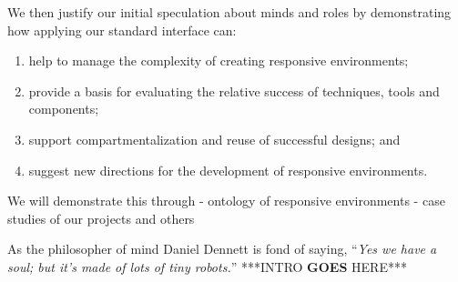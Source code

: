 We then justify our initial speculation about minds and roles by demonstrating how applying our standard interface can:

\begin{enumerate}
\item help to manage the complexity of creating responsive environments;
\item provide a basis for evaluating the relative success of techniques, tools and components;
\item support compartmentalization and reuse of successful designs; and
\item suggest new directions for the development of responsive environments.
\end{enumerate}

We will demonstrate this through
- ontology of responsive environments
- case studies of our projects and others



As the philosopher of mind Daniel Dennett is fond of saying, ``\emph{Yes we have a soul; but it's made of lots of tiny robots.}'' \citeyearpar[p. 1]{freedom_evolves}
% 
***INTRO {\bf GOES} HERE*** \citep{society_of_mind}


